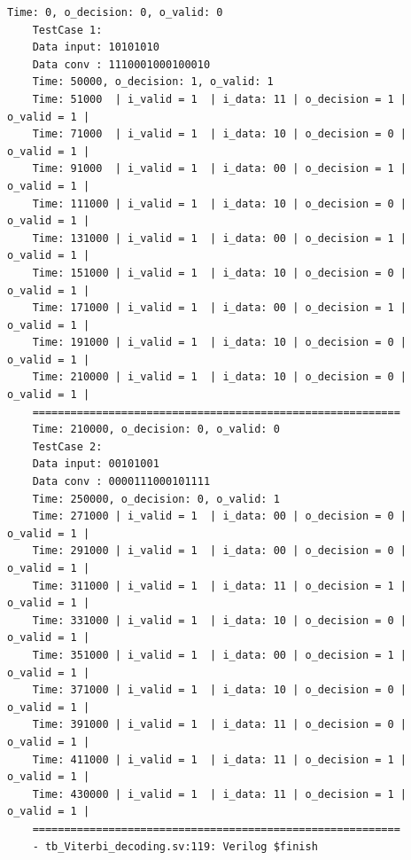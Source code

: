 \begin{lstlisting}[style=StyleResult, language=Result]
	Time: 0, o_decision: 0, o_valid: 0
	TestCase 1:
	Data input: 10101010
	Data conv : 1110001000100010
	Time: 50000, o_decision: 1, o_valid: 1
	Time: 51000  | i_valid = 1 	| i_data: 11 | o_decision = 1 | o_valid = 1 |
	Time: 71000  | i_valid = 1 	| i_data: 10 | o_decision = 0 | o_valid = 1 |
	Time: 91000  | i_valid = 1 	| i_data: 00 | o_decision = 1 | o_valid = 1 |
	Time: 111000 | i_valid = 1 	| i_data: 10 | o_decision = 0 | o_valid = 1 |
	Time: 131000 | i_valid = 1 	| i_data: 00 | o_decision = 1 | o_valid = 1 |
	Time: 151000 | i_valid = 1 	| i_data: 10 | o_decision = 0 | o_valid = 1 |
	Time: 171000 | i_valid = 1 	| i_data: 00 | o_decision = 1 | o_valid = 1 |
	Time: 191000 | i_valid = 1 	| i_data: 10 | o_decision = 0 | o_valid = 1 |
	Time: 210000 | i_valid = 1 	| i_data: 10 | o_decision = 0 | o_valid = 1 |
	==========================================================
	Time: 210000, o_decision: 0, o_valid: 0
	TestCase 2:
	Data input: 00101001
	Data conv : 0000111000101111
	Time: 250000, o_decision: 0, o_valid: 1
	Time: 271000 | i_valid = 1 	| i_data: 00 | o_decision = 0 | o_valid = 1 |
	Time: 291000 | i_valid = 1 	| i_data: 00 | o_decision = 0 | o_valid = 1 |
	Time: 311000 | i_valid = 1 	| i_data: 11 | o_decision = 1 | o_valid = 1 |
	Time: 331000 | i_valid = 1 	| i_data: 10 | o_decision = 0 | o_valid = 1 |
	Time: 351000 | i_valid = 1 	| i_data: 00 | o_decision = 1 | o_valid = 1 |
	Time: 371000 | i_valid = 1 	| i_data: 10 | o_decision = 0 | o_valid = 1 |
	Time: 391000 | i_valid = 1 	| i_data: 11 | o_decision = 0 | o_valid = 1 |
	Time: 411000 | i_valid = 1 	| i_data: 11 | o_decision = 1 | o_valid = 1 |
	Time: 430000 | i_valid = 1 	| i_data: 11 | o_decision = 1 | o_valid = 1 |
	==========================================================
	- tb_Viterbi_decoding.sv:119: Verilog $finish
\end{lstlisting}

